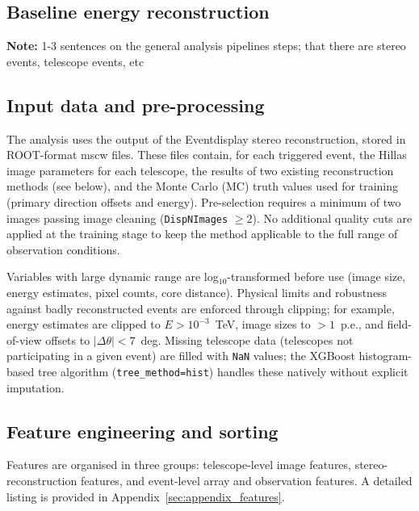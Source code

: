 \documentclass[12pt]{article}
\newcommand{\note}[1]{\begin{noteBox} \textbf{Note:} #1 \end{noteBox}}
\begin{document}
\subsection{Baseline energy reconstruction}

\note{1-3 sentences on the general analysis pipelines steps;
that there are stereo events, telescope events, etc}

\subsection{Input data and pre-processing}

The analysis uses the output of the Eventdisplay stereo reconstruction,
stored in ROOT-format mscw files.
These files contain, for each triggered event, the
Hillas image parameters for each telescope, the results of two
existing reconstruction methods (see below), and the Monte Carlo (MC) truth values
used for training (primary direction offsets and energy).
Pre-selection requires a minimum of two images passing image cleaning
(\texttt{DispNImages} $\geq 2$).
No additional quality cuts are applied at the training stage to keep the
method applicable to the full range of observation conditions.

Variables with large dynamic range are log$_{10}$-transformed before use
(image size, energy estimates, pixel counts, core distance).
Physical limits and robustness against badly reconstructed events are
enforced through clipping; for example, energy estimates are clipped to
$E > 10^{-3}$~TeV, image sizes to $> 1$~p.e., and field-of-view offsets
to $|\Delta\theta| < 7$~deg.
Missing telescope data (telescopes not participating in a given event)
are filled with \texttt{NaN} values; the XGBoost
histogram-based tree algorithm (\texttt{tree\_method=hist}) handles
these natively without explicit imputation.

\subsection{Feature engineering and sorting}
\label{sec:features}

Features are organised in three groups: telescope-level image features,
stereo-reconstruction features, and event-level array and observation features.
A detailed listing is provided in Appendix~\ref{sec:appendix_features}.
\end{document}
